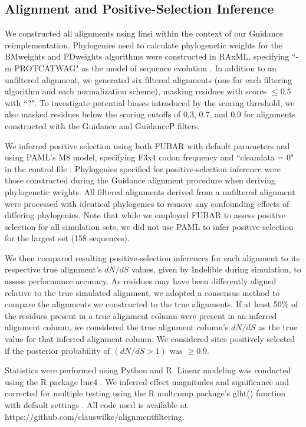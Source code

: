 \documentclass[11pt]{article}
\begin{document}
\subsection*{Alignment and Positive-Selection Inference}

We constructed all alignments using linsi \citep{Katoh2002,Katoh2005} within the context of our Guidance reimplementation. Phylogenies used to calculate phylogenetic weights for the BMweights and PDweights algorithms were constructed in RAxML, specifying ``-m PROTCATWAG" as the model of sequence evolution \citep{Stamatakis2006,Stamatakis2006C}. In addition to an unfiltered alignment, we generated six filtered alignments (one for each filtering algorithm and each normalization scheme), masking residues with scores $\leq0.5$ with ``?". To investigate potential biases introduced by the scoring threshold, we also masked residues below the scoring cutoffs of 0.3, 0.7, and 0.9 for alignments constructed with the Guidance and GuidanceP filters.

We inferred positive selection using both FUBAR \citep{Murrell2013} with default parameters and using PAML's M8 model, specifying F3x4 codon frequency and ``cleandata = 0" in the control file \citep{Yang2007}. Phylogenies specified for positive-selection inference were those constructed during the Guidance alignment procedure when deriving phylogenetic weights. All filtered alignments derived from a unfiltered alignment were processed with identical phylogenies to remove any confounding effects of differing phylogenies. Note that while we employed FUBAR to assess positive selection for all simulation sets, we did not use PAML to infer positive selection for the largest set (158 sequences).

We then compared resulting positive-selection inferences for each alignment to its respective true alignment's $dN/dS$ values, given by Indelible during simulation, to assess performance accuracy. As residues may have been differently aligned relative to the true simulated alignment, we adopted a consensus method to compare the alignments we constructed to the true alignments. If at least 50\% of the residues present in a true alignment column were present in an inferred alignment column, we considered the true alignment column's $dN/dS$ as the true value for that inferred alignment column. We considered sites positively selected if the posterior probability of $(dN/dS>1)$ was $\geq0.9$.

Statistics were performed using Python and R. Linear modeling was conducted using the R package lme4 \citep{Bates2012}. We inferred effect magnitudes and significance and corrected for multiple testing using the R multcomp package's glht() function with default settings \citep{Hothorn2008}. All code used is available at https://github.com/clauswilke/alignment\underline{\hspace*{0.2cm}}filtering.
\end{document}
